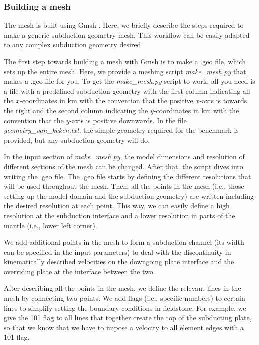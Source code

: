 \subsubsection*{Building a mesh}

The mesh is built using Gmsh \cite{gere09}. Here, we briefly describe the steps required 
to make a generic subduction geometry mesh. This workflow can be easily adapted to any 
complex subduction geometry desired. 

The first step towards building a mesh with Gmsh is to make a .geo file, which sets up the 
entire mesh. Here, we provide a meshing script {\sl make\_mesh.py} that makes a .geo file for you. 
To get the {\sl make\_mesh.py} script to work, all you need is a file with a predefined 
subduction geometry with the first column indicating all the $x$-coordinates in km 
with the convention that the positive $x$-axis is towards the right and the 
second column indicating the $y$-coordinates in km with the convention that the $y$-axis 
is positive downwards. In the file {\sl geometry\_van\_keken.txt}, 
the simple geometry required for the \cite{vack08} benchmark is provided, but any subduction geometry will do.


In the input section of {\sl make\_mesh.py}, the model dimensions and resolution of different 
sections of the mesh can be changed. After that, the script dives into writing the .geo 
file. The .geo file starts by defining the different resolutions that will be used throughout the mesh. 
Then, all the points in the mesh (i.e., those setting up the model domain and the subduction geometry) 
are written including the desired resolution at each point. This way, we can easily define a high 
resolution at the subduction interface and a lower resolution in parts of the mantle (i.e., lower left corner). 

We add additional points in the mesh to form a subduction channel (its width can be specified 
in the input parameters) to deal with the discontinuity in kinematically described velocities 
on the downgoing plate interface and the overriding plate at the interface between the two. 

After describing all the points in the mesh, we define the relevant lines in the mesh by connecting 
two points. We add flags (i.e., specific numbers) to certain lines to simplify setting the boundary 
conditions in fieldstone. For example, we give the 101 flag to all lines that together create the 
top of the subducting plate, so that we know that we have to impose a velocity to all element edges 
with a 101 flag.

